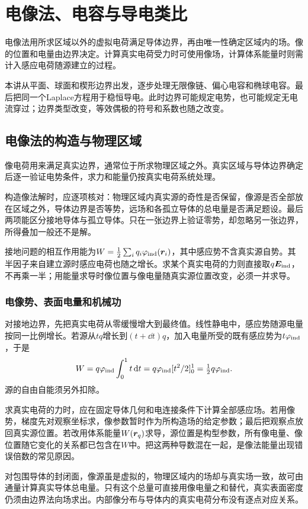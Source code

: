 \chapter{电像法、电容与导电类比}\label{ch:es3}
电像法用所求区域以外的虚拟电荷满足导体边界，再由唯一性确定区域内的场。像的位置和电量由边界决定。计算真实电荷受力时可使用像场，计算体系能量时则需计入感应电荷随源建立的过程。

本讲从平面、球面和楔形边界出发，逐步处理无限像链、偏心电容和椭球电容。最后把同一个Laplace方程用于稳恒导电。此时边界可能规定电势，也可能规定无电流穿过；边界类型改变，等效偶极的符号和系数也随之改变。


\section{电像法的构造与物理区域}\label{sec:es3-images}
像电荷用来满足真实边界，通常位于所求物理区域之外。真实区域与导体边界确定后逐一验证电势条件，求力和能量仍按真实电荷系统处理。

构造像法解时，应逐项核对：物理区域内真实源的奇性是否保留，像源是否全部放在区域之外，导体边界是否等势，远场和各孤立导体的总电量是否满足题设。最后两项能区分接地导体与孤立导体。只在一张边界上验证零势，却忽略另一张边界，所得叠加一般还不是解。

接地问题的相互作用能为$W=\tfrac12\sum_iq_i\varphi_{\rm ind}(\bm{r}_i)$，其中感应势不含真实源自势。其半因子来自建立源时感应电荷也随之增长。求某个真实电荷的力则直接取$q\bm{E}_{\rm ind}$，不再乘一半；用能量求导时像位置与像电量随真实源位置改变，必须一并求导。


\subsection{电像势、表面电量和机械功}
对接地边界，先把真实电荷从零缓慢增大到最终值。线性静电中，感应势随源电量按同一比例增长。若源从$tq$增长到$(t+\dd t)q$，加入电量所受的既有感应势为$t\varphi_{\rm ind}$，于是
\[W=q\varphi_{\rm ind}\int_0^1t\mathop{}\!\mathrm d t
=q\varphi_{\rm ind}[t^2/2]_0^1=\tfrac12q\varphi_{\rm ind}.\]
源的自由自能须另外扣除。

求真实电荷的力时，应在固定导体几何和电连接条件下计算全部感应场。若用像势，梯度先对观察坐标求，像参数暂时作为所构造场的给定参数；最后把观察点放回真实源位置。若改用体系能量$W(\bm{r}_q)$求导，源位置是构型参数，所有像电量、像位置随它变化的关系都已包含在$W$中。把这两种导数混在一起，是像法能量出现错误倍数的常见原因。

对包围导体的封闭面，像源虽是虚拟的，物理区域内的场却与真实场一致，故可由通量计算真实导体总电量。只有这个总量可直接用像电量之和替代，真实表面密度仍须由边界法向场求出。内部像分布与导体内的真实电荷分布没有逐点对应关系。

